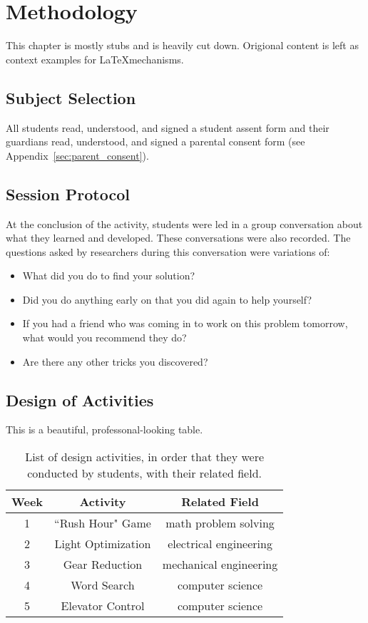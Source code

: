 \chapter{Methodology}

This chapter is mostly stubs and is heavily cut down. Origional content is left as context examples for \LaTeX mechanisms. 

\section{Subject Selection} 

All students read, understood, and signed a student assent form and their guardians read, understood, and signed a parental consent form (see Appendix~\ref{sec:parent_consent}). 

\section{Session Protocol}

At the conclusion of the activity, students were led in a group conversation about what they learned and developed. These conversations were also recorded. The questions asked by researchers during this conversation were variations of:
\begin{itemize}
\item What did you do to find your solution?
\item Did you do anything early on that you did again to help yourself?
\item If you had a friend who was coming in to work on this problem tomorrow,
what would you recommend they do?
\item Are there any other tricks you discovered?
\end{itemize}

\section{Design of Activities}
This is a beautiful, professonal-looking table.

\begin{table}
\begin{centering}
	\begin{tabular}{c  c   c}
	Week & Activity & Related Field \\ \hline
	1 & ``Rush Hour" Game & math problem solving \\ 
	2 & Light Optimization & electrical engineering \\ 
	3 & Gear Reduction & mechanical engineering \\ 
	4 & Word Search & computer science \\ 
	5 & Elevator Control & computer science \\ \hline
	\end{tabular}
	\caption[List of design activities.]{List of design activities, in order that they were conducted by students, with their related field.}
	\label{tab:activity-list}
\end{centering}
\end{table}


